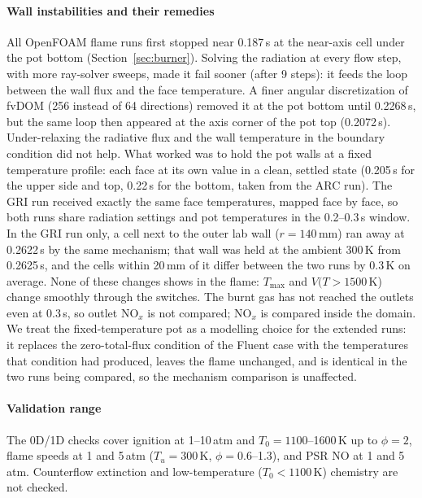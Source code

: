 \documentclass[preprint,review,12pt]{elsarticle}
\begin{document}
\paragraph{Wall instabilities and their remedies}
\label{sec:numerics}
All OpenFOAM flame runs first stopped near 0.187\,s at the near-axis cell under the pot bottom (Section~\ref{sec:burner}).
Solving the radiation at every flow step, with more ray-solver sweeps, made it fail sooner (after 9 steps): it feeds
the loop between the wall flux and the face temperature. A finer angular discretization of fvDOM (256 instead of 64
directions) removed it at the pot bottom until 0.2268\,s, but the same loop then appeared at the axis corner of the pot
top (0.2072\,s). Under-relaxing the radiative flux and the wall temperature in the boundary condition did not help. What
worked was to hold the pot walls at a fixed temperature profile: each face at its own value in a clean, settled state
(0.205\,s for the upper side and top, 0.22\,s for the bottom, taken from the ARC run). The GRI run received exactly
the same face temperatures, mapped face by face, so both runs share radiation settings and pot temperatures in the
0.2--0.3\,s window. In the GRI run only, a cell next to the outer lab wall ($r=140$\,mm) ran away at 0.2622\,s by the
same mechanism; that wall was held at the ambient 300\,K from 0.2625\,s, and the cells within 20\,mm of it differ
between the two runs by 0.3\,K on average. None of these changes shows in the flame: $T_{\max}$ and $V(T>1500$\,K)
change smoothly through the switches. The burnt gas has not reached the outlets even at 0.3\,s, so outlet NO$_x$ is not
compared; NO$_x$ is compared inside the domain. We treat the fixed-temperature pot as a modelling choice for the extended runs: it replaces the zero-total-flux
condition of the Fluent case with the temperatures that condition had produced, leaves the flame unchanged, and is
identical in the two runs being compared, so the mechanism comparison is unaffected.

\paragraph{Validation range}
The 0D/1D checks cover ignition at 1--10\,atm and $T_0=1100$--1600\,K up to $\phi=2$, flame speeds at 1 and 5\,atm
($T_u=300$\,K, $\phi=0.6$--1.3), and PSR NO at 1 and 5\,atm. Counterflow extinction and low-temperature
($T_0<1100$\,K) chemistry are not checked.

\end{document}
